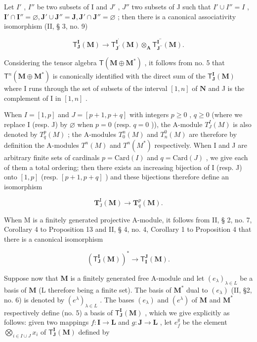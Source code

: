 Let \(I'\) , \(I''\) be two subsets of I and \(J'\) , \(J''\) two subsets of J such that \(I' \cup I'' = I\) , \(\mathbf{I}' \cap \mathbf{I}'' = \varnothing, \mathbf{J}' \cup \mathbf{J}'' = \mathbf{J}, \mathbf{J}' \cap \mathbf{J}'' = \varnothing\) ; then there is a canonical associativity isomorphism (II, § 3, no. 9)

\[
\mathsf {T} _ {\mathbf {J}} ^ {\mathbf {I}} (\mathbf {M}) \rightarrow \mathsf {T} _ {\mathbf {J} ^ {\prime}} ^ {\mathbf {I} ^ {\prime}} (\mathbf {M}) \otimes_ {\mathbf {A}} \mathsf {T} _ {\mathbf {J} ^ {\prime \prime}} ^ {\mathbf {I} ^ {\prime \prime}} (\mathbf {M}).\tag{11}
\]

Considering the tensor algebra \(\mathsf{T}(\mathbf{M}\oplus \mathbf{M}^{*})\) , it follows from no. 5 that \(\mathsf{T}^n (\mathbf{M}\oplus \mathbf{M}^*)\) is canonically identified with the direct sum of the \(\mathsf{T}_{\mathbf{J}}^{\mathbf{I}}(\mathbf{M})\) where I runs through the set of subsets of the interval \([1,n]\) of \(\mathbf{N}\) and J is the complement of I in \([1,n]\) .

When \(I = [1, p]\) and \(J = [p + 1, p + q]\) with integers \(p \geqslant 0\) , \(q \geqslant 0\) (where we replace I (resp. J) by \(\varnothing\) when \(p = 0\) (resp. \(q = 0\) )), the A-module \(T_J^I(M)\) is also denoted by \(T_q^p(M)\) ; the A-modules \(T_0^n(M)\) and \(T_n^0(M)\) are therefore by definition the A-modules \(T^n(M)\) and \(T^n(M^*)\) respectively. When I and J are arbitrary finite sets of cardinals \(p = \text{Card}(I)\) and \(q = \text{Card}(J)\) , we give each of them a total ordering; then there exists an increasing bijection of I (resp. J) onto \([1, p]\) (resp. \([p + 1, p + q]\) ) and these bijections therefore define an isomorphism

\[
\mathbf {T} _ {\mathrm{J}} ^ {\mathrm{I}} (\mathbf {M}) \rightarrow \mathbf {T} _ {q} ^ {p} (\mathbf {M}).
\]

When M is a finitely generated projective A-module, it follows from II, § 2, no. 7, Corollary 4 to Proposition 13 and II, § 4, no. 4, Corollary 1 to Proposition 4 that there is a canonical isomorphism

\[
(\mathsf {T} _ {\mathbf {J}} ^ {\mathbf {I}} (\mathbf {M})) ^ {*} \to \mathsf {T} _ {\mathbf {I}} ^ {\mathbf {J}} (\mathbf {M}).
\]

Suppose now that \(\mathbf{M}\) is a finitely generated free A-module and let \((e_{\lambda})_{\lambda \in L}\) be a basis of \(\mathbf{M}\) (L therefore being a finite set). The basis of \(\mathbf{M}^*\) dual to \((e_{\lambda})\) (II, §2, no. 6) is denoted by \((e^{\lambda})_{\lambda \in L}\) . The bases \((e_{\lambda})\) and \((e^{\lambda})\) of \(\mathbf{M}\) and \(\mathbf{M}^*\) respectively define (no. 5) a basis of \(\mathsf{T}_{\mathbf{J}}^{\mathbf{I}}(\mathbf{M})\) , which we give explicitly as follows: given two mappings \(f\colon \mathbf{I} \to \mathbf{L}\) and \(g\colon \mathbf{J} \to \mathbf{L}\) , let \(e_f^g\) be the element \(\bigotimes_{i \in I \cup J} x_i\) of \(\mathsf{T}_{\mathbf{J}}^{\mathbf{I}}(\mathbf{M})\) defined by

